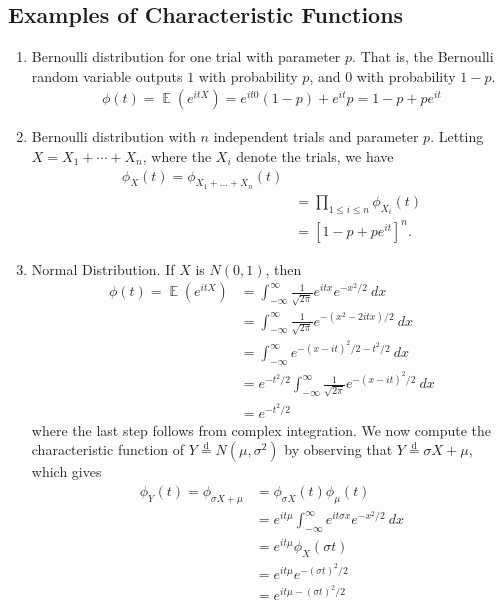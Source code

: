 \documentclass[12pt]{article}
\DeclareMathOperator{\ex}{\mathbb{E}}
\theoremstyle{plain}
\theoremstyle{definition}
\theoremstyle{remark}
\numberwithin{equation}{section}  %
\begin{document}
\subsection{Examples of Characteristic Functions}
\begin{enumerate}
	\item Bernoulli distribution for one trial with parameter $p$. That is,
		the Bernoulli random variable outputs $1$ with probability $p$,
		and $0$ with probability $1-p$.
		\begin{equation*}
		\begin{split}
			\phi(t) = \ex(e^{itX}) = e^{it0}(1-p) + e^{it}p = 1-p + pe^{it}
		\end{split}
		\end{equation*}
	\item Bernoulli distribution with $n$ independent trials and parameter
		$p$. Letting $X = X_{1} + \cdots + X_{n}$, where the $X_i$ denote
		the trials, we have
		\begin{equation*}
		\begin{split}
			\phi_{X}(t) = \phi_{X_{1} + \ldots + X_{n}}(t)
			\\
			& = \prod_{1 \le i \le n} \phi_{X_{i}}(t)
			\\
			& = \left[ 1-p + pe^{it} \right]^{n}.
		\end{split}
		\end{equation*}
	\item Normal Distribution. If $X$ is $N(0,1)$, then
		\begin{equation*}
		\begin{split}
			\phi(t) = \ex(e^{itX})
			& = \int_{-\infty}^{\infty} \frac{1}{\sqrt{2 \pi}} e^{itx}
			e^{-x^{2}/2} \ dx
			\\
			& = \int_{-\infty}^{\infty}\frac{1}{\sqrt{2 \pi}} e^{-(x^{2} -2itx)/2} \
			dx
			\\
			& = \int_{-\infty}^{\infty} e^{-(x-it)^{2}/2 - t^{2}/2} \ dx
			\\
			& = e^{-t^{2}/2} \int_{-\infty}^{\infty} \frac{1}{\sqrt{2 \pi}}
			e^{-(x - it)^{2}/2} \ dx
			\\
			& = e^{-t^{2}/2}
		\end{split}
		\end{equation*}
	where the last step follows from complex integration.	
	We now compute the characteristic function of $Y \overset{\text{d}}{=}N(\mu,
	\sigma^{2})$ by observing that $Y \overset{\text{d}}{=} \sigma X + \mu$,
	which gives
	\begin{equation*}
	\begin{split}
		\phi_{Y}(t) = \phi_{\sigma X + \mu}
		& =  \phi_{\sigma X}(t) \phi_{\mu}(t)
		\\
		& = e^{it\mu} \int_{-\infty}^{\infty} e^{i t \sigma x} e^{-x^{2}/2} \ dx
		\\
		& = e^{it \mu} \phi_{X}(\sigma t)
		\\
		& = e^{it \mu} e^{-( \sigma t)^{2}/2}
		\\
		& = e^{it \mu - (\sigma t)^{2}/2}
	\end{split}
	\end{equation*}
\end{enumerate}
\end{document}
